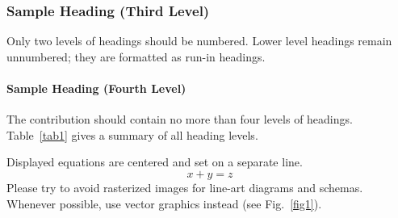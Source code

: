 \documentclass[runningheads]{llncs}
\begin{document}
\subsubsection{Sample Heading (Third Level)} Only two levels of
headings should be numbered. Lower level headings remain unnumbered;
they are formatted as run-in headings.

\paragraph{Sample Heading (Fourth Level)}
The contribution should contain no more than four levels of
headings. Table~\ref{tab1} gives a summary of all heading levels.



\noindent Displayed equations are centered and set on a separate
line.
\begin{equation}
x + y = z
\end{equation}
Please try to avoid rasterized images for line-art diagrams and
schemas. Whenever possible, use vector graphics instead (see
Fig.~\ref{fig1}).
\end{document}
